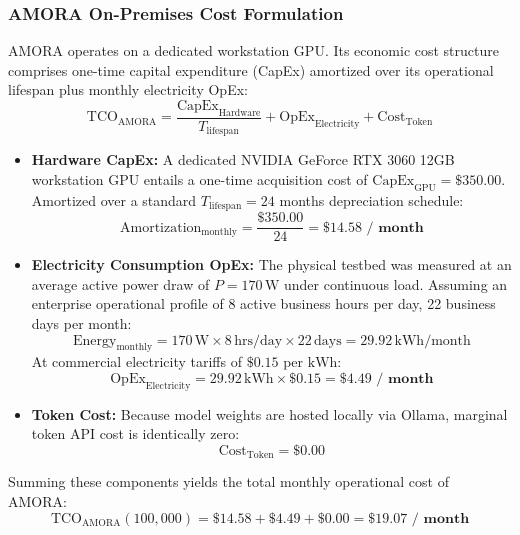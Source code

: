 \subsubsection{AMORA On-Premises Cost Formulation}
AMORA operates on a dedicated workstation GPU. Its economic cost structure comprises one-time capital expenditure (CapEx) amortized over its operational lifespan plus monthly electricity OpEx:
\begin{equation}
    \text{TCO}_{\text{AMORA}} = \frac{\text{CapEx}_{\text{Hardware}}}{T_{\text{lifespan}}} + \text{OpEx}_{\text{Electricity}} + \text{Cost}_{\text{Token}}
\end{equation}
\begin{itemize}
    \item \textbf{Hardware CapEx:} A dedicated NVIDIA GeForce RTX 3060 12GB workstation GPU entails a one-time acquisition cost of $\text{CapEx}_{\text{GPU}} = \$350.00$. Amortized over a standard $T_{\text{lifespan}} = 24$ months depreciation schedule:
    \begin{equation}
        \text{Amortization}_{\text{monthly}} = \frac{\$350.00}{24} = \mathbf{\$14.58 \text{ / month}}
    \end{equation}
    \item \textbf{Electricity Consumption OpEx:} The physical testbed was measured at an average active power draw of $P = 170\,\text{W}$ under continuous load. Assuming an enterprise operational profile of 8 active business hours per day, 22 business days per month:
    \begin{equation}
        \text{Energy}_{\text{monthly}} = 170\,\text{W} \times 8\,\text{hrs/day} \times 22\,\text{days} = 29.92\,\text{kWh/month}
    \end{equation}
    At commercial electricity tariffs of $\$0.15$ per $\text{kWh}$:
    \begin{equation}
        \text{OpEx}_{\text{Electricity}} = 29.92\,\text{kWh} \times \$0.15 = \mathbf{\$4.49 \text{ / month}}
    \end{equation}
    \item \textbf{Token Cost:} Because model weights are hosted locally via Ollama, marginal token API cost is identically zero:
    \begin{equation}
        \text{Cost}_{\text{Token}} = \mathbf{\$0.00}
    \end{equation}
\end{itemize}

Summing these components yields the total monthly operational cost of AMORA:
\begin{equation}
    \text{TCO}_{\text{AMORA}}(100{,}000) = \$14.58 + \$4.49 + \$0.00 = \mathbf{\$19.07 \text{ / month}}
\end{equation}

